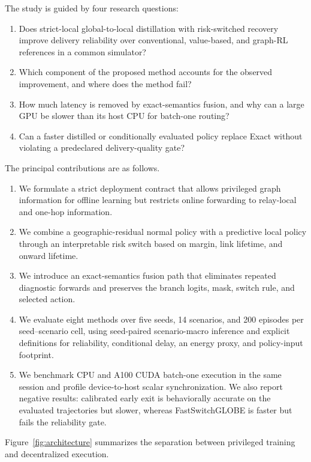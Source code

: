 \documentclass[drones,article,submit,moreauthors]{Definitions/mdpi}
\newcommand{\FastSG}{FastSwitchGLOBE}
\begin{document}
The study is guided by four research questions:
\begin{enumerate}[leftmargin=*]
\item Does strict-local global-to-local distillation with risk-switched recovery improve delivery reliability over conventional, value-based, and graph-RL references in a common simulator?
\item Which component of the proposed method accounts for the observed improvement, and where does the method fail?
\item How much latency is removed by exact-semantics fusion, and why can a large GPU be slower than its host CPU for batch-one routing?
\item Can a faster distilled or conditionally evaluated policy replace Exact without violating a predeclared delivery-quality gate?
\end{enumerate}

The principal contributions are as follows.
\begin{enumerate}[leftmargin=*]
\item We formulate a strict deployment contract that allows privileged graph information for offline learning but restricts online forwarding to relay-local and one-hop information.
\item We combine a geographic-residual normal policy with a predictive local policy through an interpretable risk switch based on margin, link lifetime, and onward lifetime.
\item We introduce an exact-semantics fusion path that eliminates repeated diagnostic forwards and preserves the branch logits, mask, switch rule, and selected action.
\item We evaluate eight methods over five seeds, 14 scenarios, and 200 episodes per seed--scenario cell, using seed-paired scenario-macro inference and explicit definitions for reliability, conditional delay, an energy proxy, and policy-input footprint.
\item We benchmark CPU and A100 CUDA batch-one execution in the same session and profile device-to-host scalar synchronization. We also report negative results: calibrated early exit is behaviorally accurate on the evaluated trajectories but slower, whereas \FastSG{} is faster but fails the reliability gate.
\end{enumerate}

Figure~\ref{fig:architecture} summarizes the separation between privileged training and decentralized execution.
\end{document}
